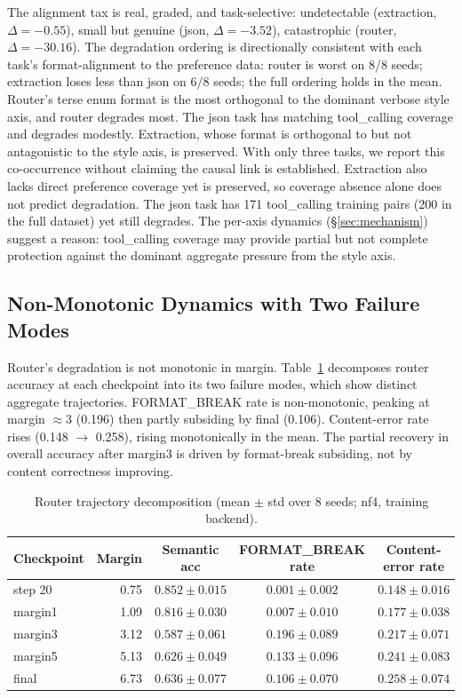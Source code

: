 \documentclass{article}
\begin{document}
The alignment tax is real, graded, and task-selective: undetectable (extraction, $\Delta = -0.55$), small but genuine (json, $\Delta = -3.52$), catastrophic (router, $\Delta = -30.16$). The degradation ordering is directionally consistent with each task's format-alignment to the preference data: router is worst on 8/8 seeds; extraction loses less than json on 6/8 seeds; the full ordering holds in the mean. Router's terse enum format is the most orthogonal to the dominant verbose style axis, and router degrades most. The json task has matching tool\_calling coverage and degrades modestly. Extraction, whose format is orthogonal to but not antagonistic to the style axis, is preserved. With only three tasks, we report this co-occurrence without claiming the causal link is established. Extraction also lacks direct preference coverage yet is preserved, so coverage absence alone does not predict degradation. The json task has 171 tool\_calling training pairs (200 in the full dataset) yet still degrades. The per-axis dynamics (\S\ref{sec:mechanism}) suggest a reason: tool\_calling coverage may provide partial but not complete protection against the dominant aggregate pressure from the style axis.

\subsection{Non-Monotonic Dynamics with Two Failure Modes}
\label{sec:nonmono}
Router's degradation is not monotonic in margin. Table~\ref{tab:router-traj} decomposes router accuracy at each checkpoint into its two failure modes, which show distinct aggregate trajectories. FORMAT\_BREAK rate is non-monotonic, peaking at margin ${\approx}3$ (0.196) then partly subsiding by final (0.106). Content-error rate rises (0.148 $\to$ 0.258), rising monotonically in the mean. The partial recovery in overall accuracy after margin3 is driven by format-break subsiding, not by content correctness improving.

\begin{table}[H]
\centering
\caption{Router trajectory decomposition (mean $\pm$ std over 8 seeds; nf4, training backend).}
\label{tab:router-traj}
\small
\begin{tabular}{@{}lrccc@{}}
\toprule
Checkpoint & Margin & Semantic acc & FORMAT\_BREAK rate & Content-error rate\\
\midrule
step 20 & 0.75 & $0.852 \pm 0.015$ & $0.001 \pm 0.002$ & $0.148 \pm 0.016$\\
margin1 & 1.09 & $0.816 \pm 0.030$ & $0.007 \pm 0.010$ & $0.177 \pm 0.038$\\
margin3 & 3.12 & $0.587 \pm 0.061$ & $0.196 \pm 0.089$ & $0.217 \pm 0.071$\\
margin5 & 5.13 & $0.626 \pm 0.049$ & $0.133 \pm 0.096$ & $0.241 \pm 0.083$\\
final & 6.73 & $0.636 \pm 0.077$ & $0.106 \pm 0.070$ & $0.258 \pm 0.074$\\
\bottomrule
\end{tabular}
\end{table}
\end{document}
